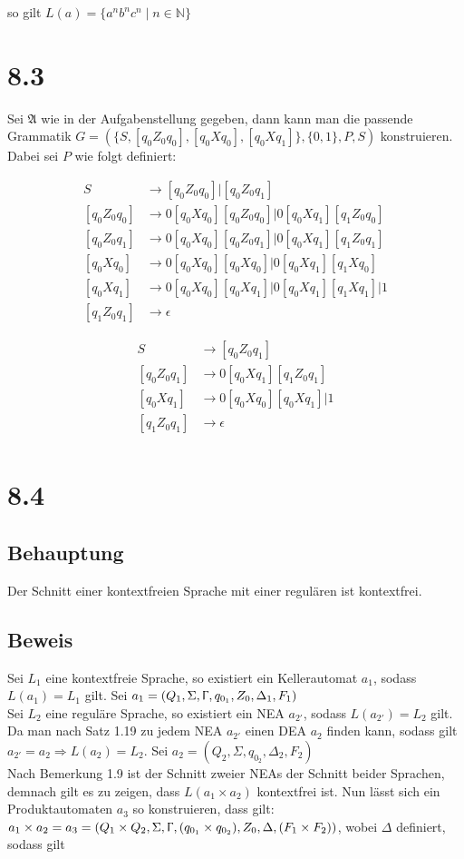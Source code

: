 \documentclass[12pt, a4paper]{article}
\begin{document}
so gilt $L(a) = \{a^n b^n c^n \mid n \in \mathbb{N} \}$
\section*{8.3}
Sei $\mathfrak{A}$ wie in der Aufgabenstellung gegeben, dann kann man die passende Grammatik $G = (\{S,[q_0Z_0q_0],[q_0Xq_0],[q_0Xq_1]\},\{0,1\},P,S)$ konstruieren. Dabei sei $P$ wie folgt definiert: 

\begin{align*}
S &\rightarrow [q_0Z_0q_0] \big| [q_0Z_0q_1]\\
[q_0Z_0q_0] &\rightarrow 0[q_0Xq_0][q_0Z_0q_0] \big| 0[q_0Xq_1][q_1Z_0q_0]\\
[q_0Z_0q_1] &\rightarrow 0[q_0Xq_0][q_0Z_0q_1] \big| 0[q_0Xq_1][q_1Z_0q_1]\\
[q_0Xq_0] &\rightarrow 0[q_0Xq_0][q_0Xq_0] \big| 0[q_0Xq_1][q_1Xq_0]\\
[q_0Xq_1] &\rightarrow 0[q_0Xq_0][q_0Xq_1] \big| 0[q_0Xq_1][q_1Xq_1] \big| 1 \\
[q_1Z_0q_1] &\rightarrow \epsilon
\end{align*}

\begin{align*}
S &\rightarrow [q_0Z_0q_1]\\
[q_0Z_0q_1] &\rightarrow 0[q_0Xq_1][q_1Z_0q_1]\\
[q_0Xq_1] &\rightarrow 0[q_0Xq_0][q_0Xq_1] \big| 1\\
[q_1Z_0q_1] &\rightarrow \epsilon\\
\end{align*}

\section*{8.4}
\subsection*{Behauptung}
Der Schnitt einer kontextfreien Sprache mit einer regulären ist kontextfrei.
\subsection*{Beweis}
Sei $L_1$ eine kontextfreie Sprache, so existiert ein Kellerautomat $a_1$, sodass $L(a_1) = L_1$ gilt. Sei $a_1 = (Q_1, \Sigma, \Upgamma, q_{0_1}, Z_0, \Delta_1, F_1)$ \\
Sei $L_2$ eine reguläre Sprache, so existiert ein NEA  $a_{2'}$, sodass $L(a_{2'}) = L_2$ gilt. 
Da man nach Satz 1.19 zu jedem NEA  $a_{2'}$ einen DEA $a_2$ finden kann, sodass gilt $a_{2'} = a_2 \Rightarrow L(a_2) = L_2$. Sei $a_2 = (Q_2, \Sigma, q_{0_2}, \Delta_2, F_2)$ \\
Nach Bemerkung 1.9 ist der Schnitt zweier NEAs der Schnitt beider Sprachen, demnach gilt es zu zeigen, dass $L(a_1 \times a_2)$ kontextfrei ist. 
Nun lässt sich ein Produktautomaten $a_3$ so konstruieren, dass gilt: $a_1 \times a_2 = a_3 = (Q_1 \times Q_2, \Sigma, \Upgamma, (q_{0_1} \times q_{0_2}), Z_0, \Delta, (F_1 \times F_2))$, wobei $\Delta$ definiert, sodass gilt
\end{document}
